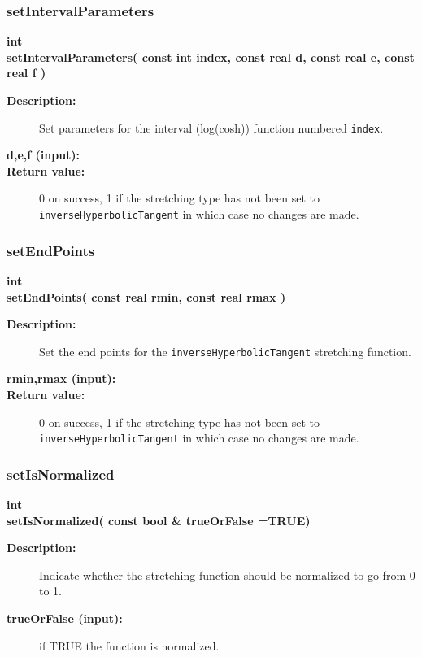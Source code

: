\subsubsection{setIntervalParameters}
 
\begin{flushleft} \textbf{%
int  \\ 
\settowidth{\StretchMappingIncludeArgIndent}{setIntervalParameters(}%
setIntervalParameters( const int index, const real d, const real e,  const real f )
}\end{flushleft}
\begin{description}
\item[{\bf Description:}]  
    Set parameters for the interval (log(cosh)) function numbered {\tt index}.
\item[{\bf d,e,f (input):}] 
\item[{\bf Return value:}]  0 on success, 1 if the stretching type has not been set to {\tt inverseHyperbolicTangent}
   in which case no changes are made.  
\end{description}
\subsubsection{setEndPoints}
 
\begin{flushleft} \textbf{%
int  \\ 
\settowidth{\StretchMappingIncludeArgIndent}{setEndPoints(}%
setEndPoints( const real rmin, const real rmax )
}\end{flushleft}
\begin{description}
\item[{\bf Description:}]  
    Set the end points for the {\tt inverseHyperbolicTangent} stretching function.
\item[{\bf rmin,rmax (input):}] 
\item[{\bf Return value:}]  0 on success, 1 if the stretching type has not been set to {\tt inverseHyperbolicTangent}
   in which case no changes are made.  
\end{description}
\subsubsection{setIsNormalized}
 
\begin{flushleft} \textbf{%
int  \\ 
\settowidth{\StretchMappingIncludeArgIndent}{setIsNormalized(}%
setIsNormalized( const bool \& trueOrFalse  =TRUE)
}\end{flushleft}
\begin{description}
\item[{\bf Description:}]  
    Indicate whether the stretching function should be normalized to go from 0 to 1.
\item[{\bf trueOrFalse (input):}]  if TRUE the function is normalized.
\end{description}
